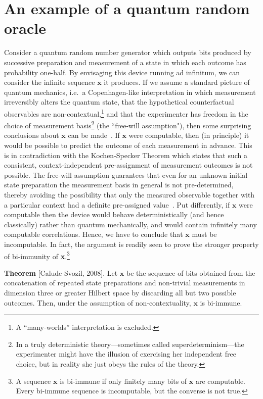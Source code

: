 \documentclass[preprint,11pt]{elsarticle}
\begin{document}
\section{An example of a quantum random oracle}

Consider a quantum random number generator  which outputs bits produced by successive preparation and measurement of a state in which each outcome has probability one-half. By envisaging this device running ad infinitum, we can consider the infinite sequence $\mathbf{x}$  it produces.
If we assume a standard picture of quantum mechanics,
i.e.\ a Copenhagen-like interpretation in which measurement irreversibly alters the quantum state,
that the hypothetical counterfactual observables are non-contextual,\footnote{A ``many-worlds'' interpretation is excluded.} and that the experimenter has freedom in the choice of measurement basis\footnote{In a truly deterministic theory---sometimes called superdeterminism---the experimenter might have the illusion of exercising her independent free choice, but in reality she just obeys the rules of the theory.}  (the ``free-will assumption"), %
then some surprising conclusions about $\mathbf{x}$ can be made~\cite{Calude:2008aa}.
If $\mathbf{x}$ were computable, then (in principle) it would be possible
to predict the outcome of each measurement in advance.
This is in contradiction with the Kochen-Specker Theorem which states that such a consistent, context-independent pre-assignment
of measurement outcomes is not possible.
The free-will assumption guarantees that even for an unknown initial state  preparation the measurement basis in general is not pre-determined, thereby avoiding the possibility that only the measured observable together with a particular context had a definite pre-assigned value~\cite{Hall:2010fk}.
Put differently, if $\mathbf{x}$ were computable
then the device would behave deterministically (and hence classically)
 rather than quantum mechanically, and would contain infinitely many computable correlations.
Hence, we have to  conclude that  $\mathbf{x}$ must be incomputable.
In fact, the argument is readily seen to prove the stronger
property of bi-immunity of {\bf x}.\footnote{A sequence ${\mathbf x}$ is bi-immune if only
finitely many bits of ${\mathbf x}$ are computable.
Every bi-immune sequence is incomputable, but the converse is not true.}


{\bf Theorem} [Calude-Svozil, 2008\nocite{Calude:2008aa}]. Let ${\mathbf x}$ be the sequence of bits obtained from the concatenation of repeated state preparations and non-trivial measurements in dimension three or greater Hilbert space by discarding all but two possible outcomes. Then, under the assumption of non-contextuality, ${\mathbf x}$ is bi-immune.
\fi
\end{document}

